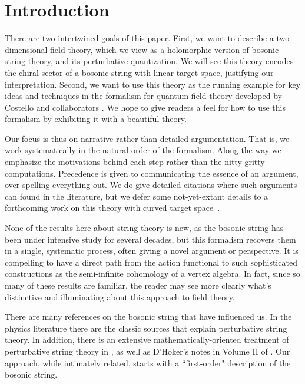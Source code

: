 
\section{Introduction}


There are two intertwined goals of this paper.
First, we want to describe a two-dimensional field theory,
which we view as a holomorphic version of bosonic string theory,
and its perturbative quantization.
We will see this theory encodes the chiral sector of a bosonic string with linear target space,
justifying our interpretation.
Second, we want to use this theory as the running example for key ideas and techniques in the formalism for quantum field theory developed by Costello and collaborators \cite{CosBook, CG1,CG2, LL1, GG1, GLL, LiVA}.
We hope to give readers a feel for how to use this formalism by exhibiting it with a beautiful theory.

Our focus is thus on narrative rather than detailed argumentation.
That is, we work systematically in the natural order of the formalism. 
Along the way we emphasize the motivations behind each step rather than the nitty-gritty computations. 
Precedence is given to communicating the essence of an argument, over spelling everything out.
We do give detailed citations where such arguments can found in the literature,
but we defer some not-yet-extant details to a forthcoming work on this theory with curved target space~\cite{GWcurved}.

None of the results here about string theory is new, 
as the bosonic string has been under intensive study for several decades,
but this formalism recovers them in a single, systematic process,
often giving a novel argument or perspective.
It is compelling to have a direct path from the action functional to such sophisticated constructions as the semi-infinite cohomology of a vertex algebra.
In fact, since so many of these results are familiar,
the reader may see more clearly what's distinctive and illuminating about this approach to field theory.

There are many references on the bosonic string that have influenced us.
In the physics literature there are the classic sources \cite{GSW1, GSW2, polchinski} that explain perturbative string theory. 
In addition, there is an extensive mathematically-oriented treatment of perturbative string theory in \cite{DP}, as well as D'Hoker's notes in Volume II of \cite{IAScourse}.
Our approach, while intimately related, starts with a ``first-order" description of the bosonic string. 

